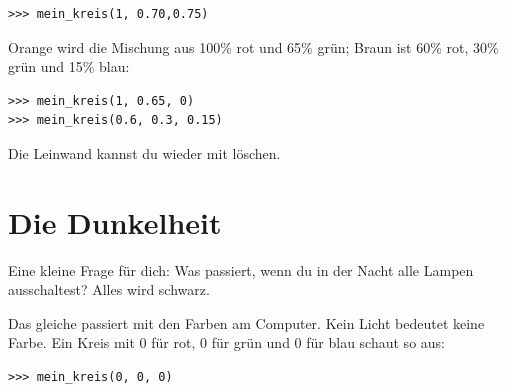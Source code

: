 \begin{Verbatim}[frame=single]
>>> mein_kreis(1, 0.70,0.75)
\end{Verbatim}

\noindent
Orange wird die Mischung aus 100\% rot und 65\% grün; Braun ist 60\% rot, 30\% grün und 15\% blau:

\begin{Verbatim}[frame=single]
>>> mein_kreis(1, 0.65, 0)
>>> mein_kreis(0.6, 0.3, 0.15)
\end{Verbatim}

\noindent
Die Leinwand kannst du wieder mit  löschen.

\section{Die Dunkelheit}

Eine kleine Frage für dich: Was passiert, wenn du in der Nacht alle Lampen ausschaltest? Alles wird schwarz.
\par
Das gleiche passiert mit den Farben am Computer. Kein Licht bedeutet keine Farbe. Ein Kreis mit 0 für rot, 0 für grün und 0 für blau schaut so aus:

\begin{Verbatim}[frame=single]
>>> mein_kreis(0, 0, 0)
\end{Verbatim}

